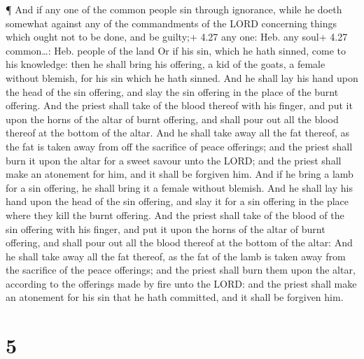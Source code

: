  ¶ And if any one of the common people sin through
ignorance, while he doeth somewhat against any of the commandments of
the LORD concerning things which ought not to be done, and be guilty;+
4.27 any one: Heb. any soul+ 4.27 common\ldots: Heb. people of the land
 Or if his sin, which he hath sinned, come to his
knowledge: then he shall bring his offering, a kid of the goats, a
female without blemish, for his sin which he hath sinned. 
And he shall lay his hand upon the head of the sin offering, and slay
the sin offering in the place of the burnt offering.  And
the priest shall take of the blood thereof with his finger, and put it
upon the horns of the altar of burnt offering, and shall pour out all
the blood thereof at the bottom of the altar.  And he shall
take away all the fat thereof, as the fat is taken away from off the
sacrifice of peace offerings; and the priest shall burn it upon the
altar for a sweet savour unto the LORD; and the priest shall make an
atonement for him, and it shall be forgiven him.  And if he
bring a lamb for a sin offering, he shall bring it a female without
blemish.  And he shall lay his hand upon the head of the
sin offering, and slay it for a sin offering in the place where they
kill the burnt offering.  And the priest shall take of the
blood of the sin offering with his finger, and put it upon the horns of
the altar of burnt offering, and shall pour out all the blood thereof at
the bottom of the altar:  And he shall take away all the
fat thereof, as the fat of the lamb is taken away from the sacrifice of
the peace offerings; and the priest shall burn them upon the altar,
according to the offerings made by fire unto the LORD: and the priest
shall make an atonement for his sin that he hath committed, and it shall
be forgiven him.

\hypertarget{section-4}{%
\section{5}\label{section-4}}

